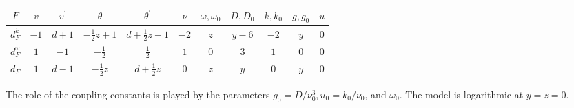 \documentclass[12pt]{article}
\begin{document}

\begin{tabular} {|c|c|c|c|c|c|c|c|c|c|c|}
    \hline
    $F$            &  $v$   &   $v^{'}$  &   $\theta$            &     $\theta^{'}$            &        $\nu$     &     $\omega, \omega_{0}$    &      $D,D_{0}$     &   $k,k_{0}$      &   $g,g_{0}$       &   $u$    \\ \hline
    $d_F^k$        &  $-1$  &   $d+1$    &   $-\frac{1}{2}z+1$   &     $d+\frac{1}{2}z-1$      &        $-2$      &     $z$                     &      $y-6$         &   $-2$           &   $y$             &    0     \\ \hline
    $d_F^{\omega}$ &  $1$   &   $-1$     &   $-\frac{1}{2}$      &     $\frac{1}{2}$           &        $1$       &     $0$                     &      $3$           &   $1$            &   $0$             &    0     \\ \hline
    $d_F$          &  $1$   &   $d-1$    &   $-\frac{1}{2}z$     &     $d+\frac{1}{2}z$        &        $0$       &     $z$                     &      $y$           &   $0$            &   $y$             &   $0$    \\ \hline
\end{tabular}

The role of the coupling constants is played by the parameters $g_0 = D/\nu^3_0, u_0 = k_0/\nu_0$, and $\omega_0$. The model is logarithmic at  $y = z = 0$.
\end{document}
